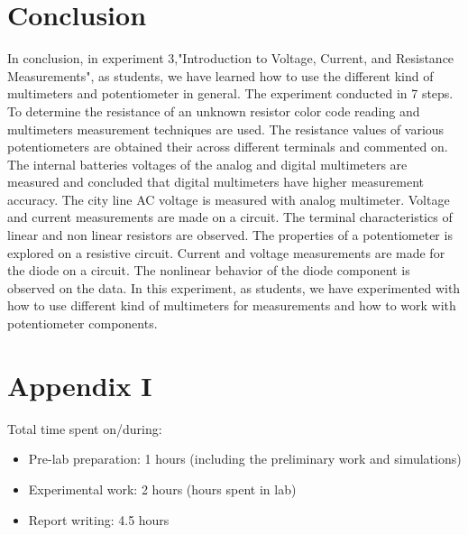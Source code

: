 \documentclass[letterpaper,12pt]{article}
\begin{document}
\section{Conclusion}
In conclusion, in experiment 3,"Introduction to Voltage, Current, and Resistance Measurements", as students, we have learned how to use the different kind of multimeters and potentiometer in general. The experiment conducted in 7 steps. To determine the resistance of an unknown resistor color code reading and multimeters measurement techniques are used. The resistance values of various potentiometers are obtained their across different terminals and commented on. The internal batteries voltages of the analog and digital multimeters are measured and concluded that digital multimeters have higher measurement accuracy. The city line AC voltage is measured with analog multimeter. Voltage and current measurements are made on a circuit. The terminal characteristics of linear and non linear resistors are observed. The properties of a potentiometer is explored on a resistive circuit. Current and voltage measurements are made for the diode on a circuit. The nonlinear behavior of the diode component is observed on the data.  In this experiment, as students, we have experimented with how to use different kind of multimeters for measurements and how to work with potentiometer components.
\section*{Appendix I}
Total time spent on/during:
\begin{itemize}
	\item Pre-lab preparation: 1 hours (including the preliminary work and simulations) 
	\item Experimental work: 2 hours (hours spent in lab)
	\item Report writing: 4.5 hours 
\end{itemize}



\end{document}
